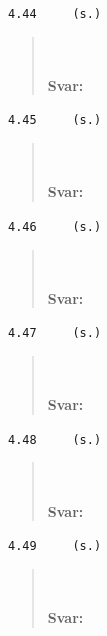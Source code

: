 \documentclass[a4paper]{article}
\newcommand{\tskcol}[1]{\textcolor{tskcol}{#1}}
\begin{document}
\texttt{\tskcol{4.44~~~~ (s.)}}
\begin{quotation}
	\noindent
	\\ \\
	\textbf{Svar:}
\end{quotation}

\texttt{\tskcol{4.45~~~~ (s.)}}
\begin{quotation}
	\noindent
	\\ \\
	\textbf{Svar:}
\end{quotation}

\texttt{\tskcol{4.46~~~~ (s.)}}
\begin{quotation}
	\noindent
	\\ \\
	\textbf{Svar:}
\end{quotation}

\texttt{\tskcol{4.47~~~~ (s.)}}
\begin{quotation}
	\noindent
	\\ \\
	\textbf{Svar:}
\end{quotation}

\texttt{\tskcol{4.48~~~~ (s.)}}
\begin{quotation}
	\noindent
	\\ \\
	\textbf{Svar:}
\end{quotation}

\texttt{\tskcol{4.49~~~~ (s.)}}
\begin{quotation}
	\noindent
	\\ \\
	\textbf{Svar:}
\end{quotation}
\end{document}
